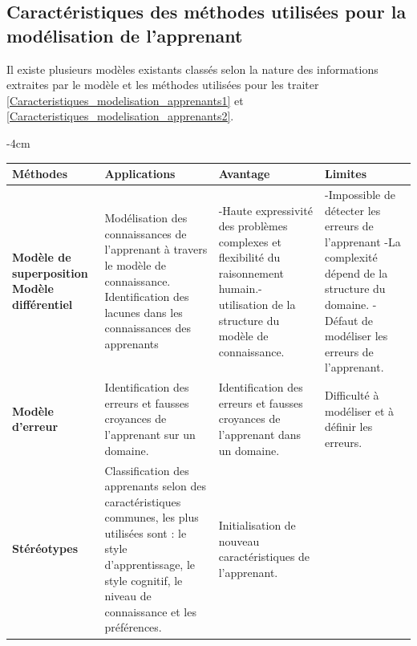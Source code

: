\subsection{Caractéristiques des méthodes utilisées pour la modélisation de l'apprenant}
Il existe plusieurs modèles existants classés selon la nature des informations extraites par le modèle et les méthodes utilisées pour les traiter \ref{Caracteristiques_modelisation_apprenants1} et \ref{Caracteristiques_modelisation_apprenants2}. \cite{student_model_centered_architecture}

\begin{table}[H]
	\centering
	\addtolength{\leftskip} {-4cm}
	\addtolength{\rightskip}{-4.5cm}
	\begin{tabular}{|m{3cm}|m{5cm}|m{5cm}|m{4cm}|}
	\hline
	\rowcolor{blueforest}
	\color{white} \textbf{Méthodes} & \color{white} \textbf{Applications} & \color{white} \textbf{Avantage} & \color{white} \textbf{Limites} \\
	\hline\hline
	\textbf{Modèle de superposition} \newline {------------------} \newline  \textbf{Modèle différentiel}   &
	  Modélisation des connaissances  de l'apprenant à travers   le modèle de connaissance. \newline {-------------------------------} \newline  Identification des lacunes dans les connaissances des apprenants &
	  -Haute expressivité des   problèmes complexes et   flexibilité du raisonnement humain.\newline - utilisation de la structure   du modèle de connaissance.&
	  -Impossible de détecter   les erreurs de l'apprenant \newline -La complexité dépend de   la structure du domaine. \newline  - Défaut de modéliser   les erreurs de l'apprenant. \\ \hline
	  \textbf{Modèle d'erreur}  &
	  Identification des erreurs et fausses croyances de l'apprenant sur un domaine.&
	  Identification des erreurs et fausses croyances de l'apprenant dans un domaine.&
	  Difficulté à modéliser et à définir les erreurs. \\ \hline
	  \textbf{Stéréotypes}  &
	  Classification des apprenants selon des caractéristiques communes, les plus utilisées sont : le style d'apprentissage, le style cognitif, le niveau de connaissance et les préférences.&
	  Initialisation de nouveau caractéristiques de l'apprenant. & \\ \hline

\end{tabular}
\end{table}
